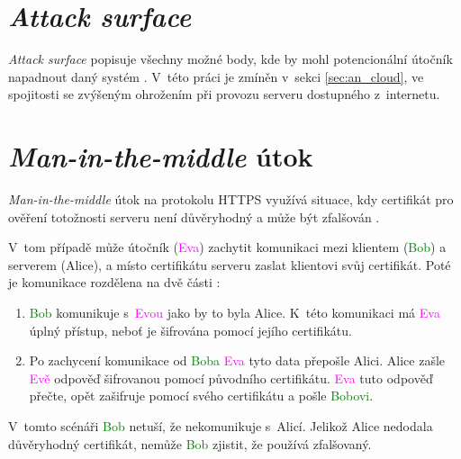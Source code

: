 

\section{\textit{Attack surface}}

\textit{Attack surface} popisuje všechny možné body, kde by mohl potencionální útočník napadnout daný systém \cite{attack_surface_owasp}. V~této práci je zmíněn v~sekci \ref{sec:an_cloud}, ve spojitosti se zvýšeným ohrožením při provozu serveru dostupného z~internetu.

\section{\textit{Man-in-the-middle} útok}

\textit{Man-in-the-middle} útok na protokolu HTTPS využívá situace, kdy certifikát pro ověření totožnosti serveru není důvěryhodný a může být zfalšován \cite{mitm}. 

V~tom případě může útočník (\textcolor{magenta}{Eva}) zachytit komunikaci mezi klientem (\textcolor{green}{Bob}) a serverem (\textcolor{blue2}{Alice}), a místo certifikátu serveru zaslat klientovi svůj certifikát. Poté je komunikace rozdělena na dvě části \cite{mitm}:

\begin{enumerate}
    \item \textcolor{green}{Bob} komunikuje s~\textcolor{magenta}{Evou} jako by to byla \textcolor{blue2}{Alice}. K~této komunikaci má \textcolor{magenta}{Eva} úplný přístup, neboť je šifrována pomocí jejího certifikátu.
    \item Po zachycení komunikace od \textcolor{green}{Boba} \textcolor{magenta}{Eva} tyto data přepošle \textcolor{blue2}{Alici}. \textcolor{blue2}{Alice} zašle \textcolor{magenta}{Evě} odpověď šifrovanou pomocí původního certifikátu. \textcolor{magenta}{Eva} tuto odpověď přečte, opět zašifruje pomocí svého certifikátu a pošle \textcolor{green}{Bobovi}.
\end{enumerate}

V~tomto scénáři \textcolor{green}{Bob} netuší, že nekomunikuje s~\textcolor{blue2}{Alicí}. Jelikož \textcolor{blue2}{Alice} nedodala důvěryhodný certifikát, nemůže \textcolor{green}{Bob} zjistit, že používá zfalšovaný.

